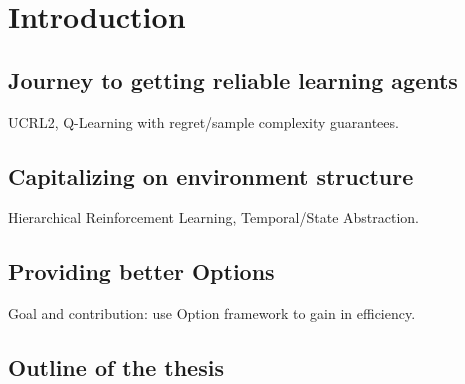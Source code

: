 
\chapter{Introduction}

\label{chapter1}




\section{Journey to getting reliable learning agents}

UCRL2, Q-Learning with regret/sample complexity guarantees.


\section{Capitalizing on environment structure}

Hierarchical Reinforcement Learning, Temporal/State Abstraction.


\section{Providing better Options}

Goal and contribution: use Option framework to gain in efficiency.


\section{Outline of the thesis}
